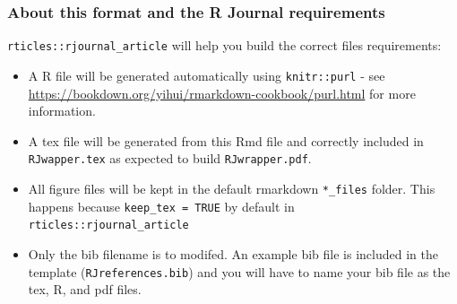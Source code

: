 \hypertarget{about-this-format-and-the-r-journal-requirements}{%
\subsubsection{About this format and the R Journal
requirements}\label{about-this-format-and-the-r-journal-requirements}}

\texttt{rticles::rjournal\_article} will help you build the correct
files requirements:

\begin{itemize}
\tightlist
\item
  A R file will be generated automatically using \texttt{knitr::purl} -
  see \url{https://bookdown.org/yihui/rmarkdown-cookbook/purl.html} for
  more information.
\item
  A tex file will be generated from this Rmd file and correctly included
  in \texttt{RJwapper.tex} as expected to build \texttt{RJwrapper.pdf}.
\item
  All figure files will be kept in the default rmarkdown
  \texttt{*\_files} folder. This happens because
  \texttt{keep\_tex\ =\ TRUE} by default in
  \texttt{rticles::rjournal\_article}
\item
  Only the bib filename is to modifed. An example bib file is included
  in the template (\texttt{RJreferences.bib}) and you will have to name
  your bib file as the tex, R, and pdf files.
\end{itemize}



\address{%
Emi Tanaka\\
Monash University\\%
Monash University\\ Clayton campus, VIC 3800, Australia\\
%
\url{http://emitanaka.org/}%
\\\textit{ORCiD: \href{https://orcid.org/0000-0002-1455-259X}{0000-0002-1455-259X}}%
\\\href{mailto:emi.tanaka@monash.edu}{\nolinkurl{emi.tanaka@monash.edu}}
}
